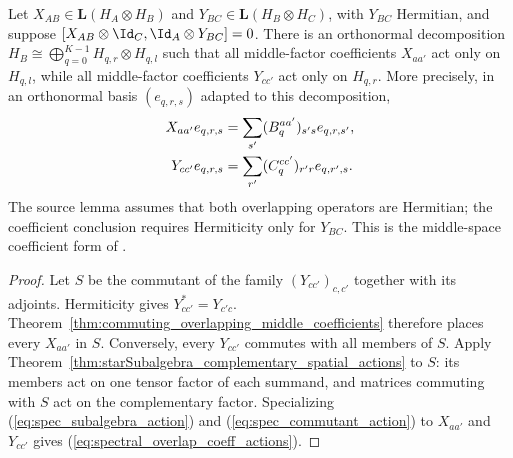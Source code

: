 \begin{theorem}%
    \label{thm:commuting_overlapping_coefficient_spatial_decomposition}
    \leanok
    Let $X_{AB}\in\mathbf L(H_A\otimes H_B)$ and
    $Y_{BC}\in\mathbf L(H_B\otimes H_C)$, with $Y_{BC}$ Hermitian, and
    suppose $[X_{AB}\otimes\Id_C,\Id_A\otimes Y_{BC}]=0$. There is an
    orthonormal decomposition
    $H_B\cong\bigoplus_{q=0}^{K-1}H_{q,r}\otimes H_{q,l}$ such that all
    middle-factor coefficients $X_{aa'}$ act only on $H_{q,l}$, while all
    middle-factor coefficients $Y_{cc'}$ act only on $H_{q,r}$. More
    precisely, in an orthonormal basis $(e_{q,r,s})$ adapted to this
    decomposition,
    \begin{align}
        X_{aa'}e_{q,r,s}
        &=\sum_{s'}(B^{aa'}_q)_{s's}e_{q,r,s'}, \notag\\
        Y_{cc'}e_{q,r,s}
        &=\sum_{r'}(C^{cc'}_q)_{r'r}e_{q,r',s}.
        \label{eq:spectral_overlap_coeff_actions}
    \end{align}
    The source lemma assumes that both overlapping operators are Hermitian;
    the coefficient conclusion requires Hermiticity only for $Y_{BC}$.
    This is the middle-space coefficient form of
    \cite[Lemma~2.1]{Beigi2012Classification}.
\end{theorem}

\begin{proof}
    \leanok
    Let $S$ be the commutant of the family $(Y_{cc'})_{c,c'}$ together with
    its adjoints. Hermiticity gives $Y_{cc'}^*=Y_{c'c}$.
    Theorem~\ref{thm:commuting_overlapping_middle_coefficients} therefore
    places every $X_{aa'}$ in $S$. Conversely, every $Y_{cc'}$ commutes
    with all members of $S$. Apply
    Theorem~\ref{thm:starSubalgebra_complementary_spatial_actions} to $S$:
    its members act on one tensor factor of each summand, and matrices
    commuting with $S$ act on the complementary factor. Specializing
    (\ref{eq:spec_subalgebra_action}) and
    (\ref{eq:spec_commutant_action}) to $X_{aa'}$ and $Y_{cc'}$ gives
    (\ref{eq:spectral_overlap_coeff_actions}).
\end{proof}

